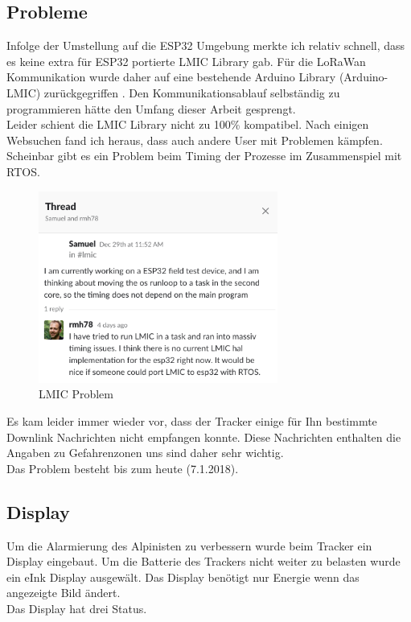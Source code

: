 \documentclass[11pt,english,german]{report}
\theoremstyle{definition}
\begin{document}
\newpage
\subsection{Probleme}
Infolge der Umstellung auf die ESP32 Umgebung merkte ich relativ schnell, dass es keine extra für ESP32 portierte LMIC Library gab. Für die LoRaWan Kommunikation wurde daher auf eine bestehende Arduino Library (Arduino-LMIC) zurückgegriffen \cite{ArduinoLMIC}. Den Kommunikationsablauf selbständig zu programmieren hätte den Umfang dieser Arbeit gesprengt.\\[0.3cm]
Leider schient die LMIC Library nicht zu 100\% kompatibel. Nach einigen Websuchen fand ich heraus, dass auch andere User mit Problemen kämpfen. Scheinbar gibt es ein Problem beim Timing der Prozesse im Zusammenspiel mit RTOS.
\begin{figure}[H]
	\centering
	\includegraphics[width=0.7\textwidth]{img/prototype/lmic_issue.png}
	\caption[LMIC Problem]
	{LMIC Problem}
\end{figure}
Es kam leider immer wieder vor, dass der Tracker einige für Ihn bestimmte Downlink Nachrichten nicht empfangen konnte. Diese Nachrichten enthalten die Angaben zu Gefahrenzonen uns sind daher sehr wichtig.\\[0.3cm]
Das Problem besteht bis zum heute (7.1.2018).
\newpage
\subsection{Display}
Um die Alarmierung des Alpinisten zu verbessern wurde beim Tracker ein Display eingebaut. Um die Batterie des Trackers nicht weiter zu belasten wurde ein eInk Display ausgewält. Das Display benötigt nur Energie wenn das angezeigte Bild ändert.\\[0.3cm]
Das Display hat drei Status.
\end{document}

